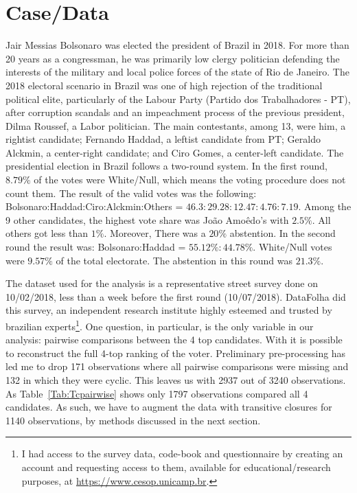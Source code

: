 \documentclass[hidelinks,11pt]{article}
\begin{document}
\section{Case/Data}


Jair Messias Bolsonaro was elected the president of Brazil in 2018. For more
than 20 years as a congressman, he was primarily low clergy politician defending
the interests of the military and local police forces of the state of Rio de
Janeiro. The 2018 electoral scenario in Brazil was one of high rejection of the
traditional political elite, particularly of the Labour Party (Partido dos
Trabalhadores - PT), after corruption scandals and an impeachment process of the
previous president, Dilma Roussef, a Labor politician. The main contestants,
among 13, were him, a rightist candidate; Fernando Haddad, a leftist candidate
from PT; Geraldo Alckmin, a center-right candidate; and Ciro Gomes, a
center-left candidate. The presidential election in Brazil follows a two-round
system. In the first round, \(8.79\%\) of the votes were White/Null, which means
the voting procedure does not count them. The result of the valid votes was the
following: Bolsonaro:Haddad:Ciro:Alckmin:Others =
\(46.3:29.28:12.47:4.76:7.19 \). Among the 9 other candidates, the highest vote
share was João Amoêdo's with \(2.5\%\). All others got less than \(1\%\).
Moreover, There was a \(20\%\) abstention. In the second round the result was:
Bolsonaro:Haddad = \(55.12\% : 44.78\% \). White/Null votes were \(9.57\%\) of
the total electorate. The abstention in this round was \(21.3\%\).


The dataset used for the analysis is a representative street survey done on
10/02/2018, less than a week before the first round (10/07/2018). DataFolha did this survey, an independent research institute highly esteemed and
trusted by brazilian experts\footnote{I had access to the survey data, code-book and
  questionnaire by creating an account and requesting access to them,
  available for educational/research purposes, at
  \url{https://www.cesop.unicamp.br}.}. One question, in particular, is the only
variable in our analysis: pairwise comparisons between the 4 top candidates.
With it is possible to reconstruct the full 4-top ranking of the voter.
Preliminary pre-processing has led me to drop 171 observations where all
pairwise comparisons were missing and 132 in which they were cyclic. This leaves
us with 2937 out of 3240 observations. As Table~\ref{Tab:Tcpairwise} shows only
1797 observations compared all 4 candidates. As such, we have to augment the
data with transitive closures for 1140 observations, by methods discussed in the
next section.
\end{document}
